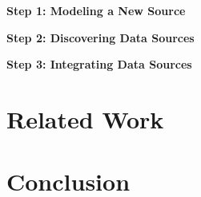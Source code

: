 \documentclass[runningheads,a4paper]{llncs}
\begin{document}
\textbf{Step 1: Modeling a New Source} 


\textbf{Step 2: Discovering Data Sources} 


\textbf{Step 3: Integrating Data Sources} 

\section{Related Work} 

\section{Conclusion} 

\vspace{-5mm}


\end{document}

